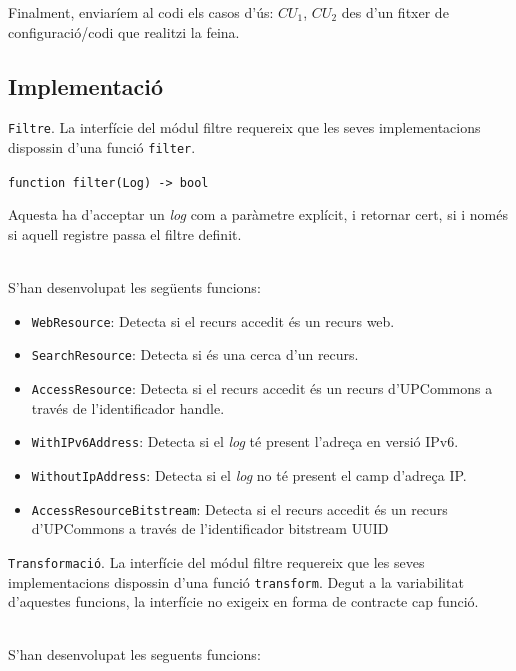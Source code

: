 \noindent
Finalment, enviaríem al codi els casos d’ús: \(CU_1\), \(CU_2\) des d'un fitxer de configuració/codi que realitzi la feina.

\clearpage

\subsection{Implementació}\label{subsec:log-implementation}

\noindent
\texttt{Filtre}.
La interfície del módul filtre requereix que les seves implementacions dispossin d'una funció \texttt{filter}.
\begin{center}
    \texttt{function filter(Log) -> bool}
\end{center}
Aquesta ha d'acceptar un \textit{log} com a paràmetre explícit, i retornar cert, si i només si aquell registre passa el filtre definit.

\noindent \\
S'han desenvolupat les següents funcions:

\begin{itemize}
    \item \texttt{WebResource}: Detecta si el recurs accedit és un recurs web.
    \item \texttt{SearchResource}: Detecta si és una cerca d’un recurs.
    \item \texttt{AccessResource}: Detecta si el recurs accedit és un recurs d’\gls{UPCommons} a través de l'identificador \gls{handle}.
    \item \texttt{WithIPv6Address}: Detecta si el \textit{log} té present l’adreça en versió IPv6.
    \item \texttt{WithoutIpAddress}: Detecta si el \textit{log} no té present el camp d'adreça \gls{IP}.
    \item \texttt{AccessResourceBitstream}: Detecta si el recurs accedit és un recurs d’\gls{UPCommons} a través de l'identificador \gls{bitstream} \gls{UUID}
\end{itemize}

\clearpage

\noindent
\texttt{Transformació}.
La interfície del módul filtre requereix que les seves implementacions dispossin d'una funció \texttt{transform}.
Degut a la variabilitat d'aquestes funcions, la interfície no exigeix en forma de contracte cap funció.

\noindent \\
S'han desenvolupat les seguents funcions:

